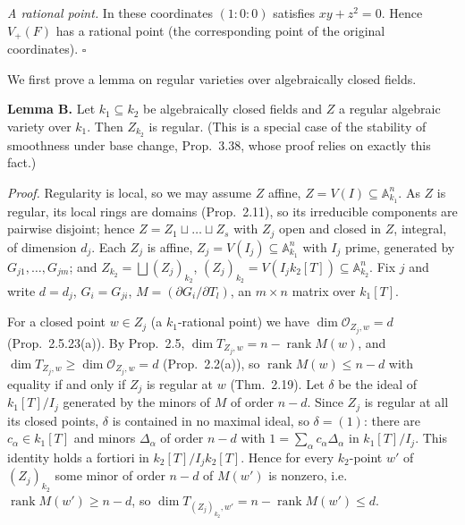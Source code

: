 \documentclass[11pt]{article}
\begin{document}
\emph{A rational point.} In these coordinates $(1:0:0)$ satisfies $xy+z^2=0$. Hence $V_+(F)$ has a rational point (the corresponding point of the original coordinates). \hfill$\square$

\pf
We first prove a lemma on regular varieties over algebraically closed fields.

\textbf{Lemma B.} Let $k_1\subseteq k_2$ be algebraically closed fields and $Z$ a regular algebraic variety over $k_1$. Then $Z_{k_2}$ is regular. (This is a special case of the stability of smoothness under base change, Prop.~3.38, whose proof relies on exactly this fact.)

\emph{Proof.} Regularity is local, so we may assume $Z$ affine, $Z=V(I)\subseteq\mathbb A^n_{k_1}$. As $Z$ is regular, its local rings are domains (Prop.~2.11), so its irreducible components are pairwise disjoint; hence $Z=Z_1\sqcup\dots\sqcup Z_s$ with $Z_j$ open and closed in $Z$, integral, of dimension $d_j$. Each $Z_j$ is affine, $Z_j=V(I_j)\subseteq\mathbb A^n_{k_1}$ with $I_j$ prime, generated by $G_{j1},\dots,G_{jm}$; and $Z_{k_2}=\bigsqcup(Z_j)_{k_2}$, $(Z_j)_{k_2}=V(I_jk_2[T])\subseteq\mathbb A^n_{k_2}$. Fix $j$ and write $d=d_j$, $G_i=G_{ji}$, $M=(\partial G_i/\partial T_l)$, an $m\times n$ matrix over $k_1[T]$.

For a closed point $w\in Z_j$ (a $k_1$-rational point) we have $\dim\mathcal O_{Z_j,w}=d$ (Prop.~2.5.23(a)). By Prop.~2.5, $\dim T_{Z_j,w}=n-\operatorname{rank}M(w)$, and $\dim T_{Z_j,w}\ge\dim\mathcal O_{Z_j,w}=d$ (Prop.~2.2(a)), so $\operatorname{rank}M(w)\le n-d$ with equality if and only if $Z_j$ is regular at $w$ (Thm.~2.19). Let $\delta$ be the ideal of $k_1[T]/I_j$ generated by the minors of $M$ of order $n-d$. Since $Z_j$ is regular at all its closed points, $\delta$ is contained in no maximal ideal, so $\delta=(1)$: there are $c_\alpha\in k_1[T]$ and minors $\Delta_\alpha$ of order $n-d$ with $1=\sum_\alpha c_\alpha\Delta_\alpha$ in $k_1[T]/I_j$. This identity holds a fortiori in $k_2[T]/I_jk_2[T]$. Hence for every $k_2$-point $w'$ of $(Z_j)_{k_2}$ some minor of order $n-d$ of $M(w')$ is nonzero, i.e.\ $\operatorname{rank}M(w')\ge n-d$, so $\dim T_{(Z_j)_{k_2},w'}=n-\operatorname{rank}M(w')\le d$.
\end{document}
